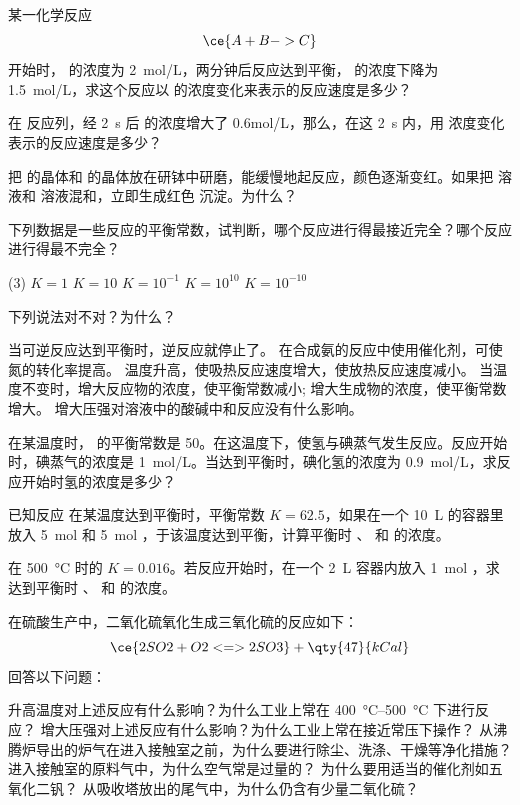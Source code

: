\begin{Review}
\begin{question}
  \item 某一化学反应
  \[ \ce{ A + B -> C}\]
  开始时， 的浓度为 \qty{2}{mol/L}，两分钟后反应达到平衡， 的浓度下降为 \qty{1.5}{mol/L}，求这个反应以  的浓度变化来表示的反应速度是多少？
  \item 在  反应列，经 \qty{2}{s} 后  的浓度增大了 {0.6}{mol/L}，那么，在这 \qty{2}{s} 内，用  浓度变化表示的反应速度是多少？
  \item 把  的晶体和  的晶体放在研钵中研磨，能缓慢地起反应，颜色逐渐变红。如果把  溶液和  溶液混和，立即生成红色  沉淀。为什么？
  \item 下列数据是一些反应的平衡常数，试判断，哪个反应进行得最接近完全？哪个反应进行得最不完全？
  \begin{tasks}(3)
    \task $K=1$
    \task $K=10$
    \task $K=10^{-1}$
    \task $K=10^{10}$
    \task $K=10^{-10}$
  \end{tasks}
  \item 下列说法对不对？为什么？
  \begin{tasks}[label=(\arabic*)]
    \task 当可逆反应达到平衡时，逆反应就停止了。
    \task 在合成氨的反应中使用催化剂，可使氮的转化率提高。
    \task 温度升高，使吸热反应速度增大，使放热反应速度减小。
    \task 当温度不变时，增大反应物的浓度，使平衡常数减小; 增大生成物的浓度，使平衡常数增大。
    \task 增大压强对溶液中的酸碱中和反应没有什么影响。
  \end{tasks}
  \item 在某温度时， 的平衡常数是 50。在这温度下，使氢与碘蒸气发生反应。反应开始时，碘蒸气的浓度是 \qty{1}{mol/L}。当达到平衡时，碘化氢的浓度为 \qty{0.9}{mol/L}，求反应开始时氢的浓度是多少？
  \item 已知反应  在某温度达到平衡时，平衡常数 $K=62.5$，如果在一个 \qty{10}{L} 的容器里放入 \qty{5}{mol}  和 \qty{5}{mol} ，于该温度达到平衡，计算平衡时 、 和  的浓度。
  \item {} 在 \qty{500}{\celsius} 时的 $K=0.016$。若反应开始时，在一个 \qty{2}{L} 容器内放入 \qty{1}{mol} ，求达到平衡时 、 和  的浓度。
  \item 在硫酸生产中，二氧化硫氧化生成三氧化硫的反应如下：
  \[ \ce{ 2SO2 +O2 <=> 2SO3} +\qty{47}{kCal} \]
  回答以下问题：
  \begin{tasks}[label=(\arabic*)]
    \task 升高温度对上述反应有什么影响？为什么工业上常在 \qtyrange{400}{500}{\celsius} 下进行反应？
    \task 增大压强对上述反应有什么影响？为什么工业上常在接近常压下操作？
    \task 从沸腾炉导出的炉气在进入接触室之前，为什么要进行除尘、洗涤、干燥等净化措施？
    \task 进入接触室的原料气中，为什么空气常是过量的？
    \task 为什么要用适当的催化剂如五氧化二钒？
    \task 从吸收塔放出的尾气中，为什么仍含有少量二氧化硫？
  \end{tasks}
\end{question}
\end{Review}

